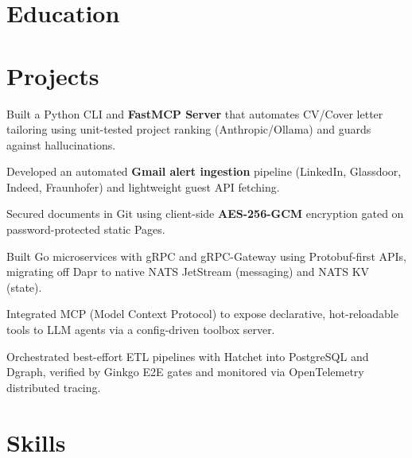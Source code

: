 \documentclass[10pt,a4paper]{resume}
\begin{document}
\section{Education}

\vspace{2pt}

\section{Projects}

\bullets
  \item Built a Python CLI and \textbf{FastMCP Server} that automates CV/Cover letter tailoring using unit-tested project ranking (Anthropic/Ollama) and guards against hallucinations.
  \item Developed an automated \textbf{Gmail alert ingestion} pipeline (LinkedIn, Glassdoor, Indeed, Fraunhofer) and lightweight guest API fetching.
  \item Secured documents in Git using client-side \textbf{AES-256-GCM} encryption gated on password-protected static Pages.
\bulletsend
\vspace{1.0pt}
\bullets
  \item Built Go microservices with gRPC and gRPC-Gateway using Protobuf-first APIs, migrating off Dapr to native NATS JetStream (messaging) and NATS KV (state).
  \item Integrated MCP (Model Context Protocol) to expose declarative, hot-reloadable tools to LLM agents via a config-driven toolbox server.
  \item Orchestrated best-effort ETL pipelines with Hatchet into PostgreSQL and Dgraph, verified by Ginkgo E2E gates and monitored via OpenTelemetry distributed tracing.
\bulletsend

\section{Skills}
\end{document}
